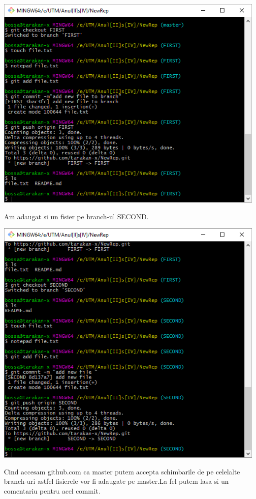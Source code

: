 \begin{center}
\includegraphics[scale=0.7]{images/first.png} 
\end{center}
Am adaugat si un fisier pe branch-ul SECOND.
\begin{center}
\includegraphics[scale=0.7]{images/second.png} 
\end{center}
Cind accesam github.com ca master putem accepta schimbarile de pe celelalte branch-uri astfel fisierele vor fi adaugate pe master.La fel putem lasa si un comentariu pentru acel commit.
